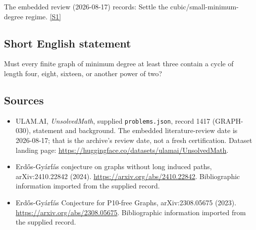 \documentclass[11pt,a4paper]{article}
\newcommand{\sref}[2]{\hyperlink{source:#1:#2}{[S#2]}}
\begin{document}
The embedded review (2026-08-17) records: Settle the cubic/small-minimum-degree regime. \sref{1417}{1}

\subsection{Short English statement}

Must every finite graph of minimum degree at least three contain a cycle of length four, eight, sixteen, or another power of two?

\subsection{Sources}

{\small

\begin{itemize}

\item[\hypertarget{source:1417:1}{S1}] ULAM.AI, \emph{UnsolvedMath}, supplied \texttt{problems.json}, record 1417 (GRAPH-030), statement and background. The embedded literature-review date is 2026-08-17; that is the archive’s review date, not a fresh certification. Dataset landing page: \url{https://huggingface.co/datasets/ulamai/UnsolvedMath}.

\item[\hypertarget{source:1417:2}{S2}] Erdős-Gyárfás conjecture on graphs without long induced paths, arXiv:2410.22842 (2024). \url{https://arxiv.org/abs/2410.22842}. Bibliographic information imported from the supplied record.

\item[\hypertarget{source:1417:3}{S3}] Erdős-Gyárfás Conjecture for P10-free Graphs, arXiv:2308.05675 (2023). \url{https://arxiv.org/abs/2308.05675}. Bibliographic information imported from the supplied record.

\end{itemize}

}

\label{end:1417}
\end{document}

